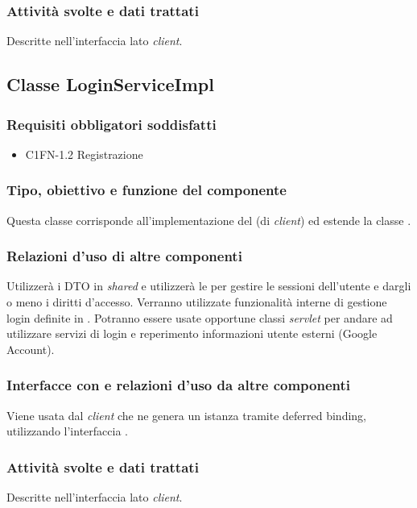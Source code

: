 \subsubsection*{Attivit\`a svolte e dati trattati}
Descritte nell'interfaccia lato \emph{client}.

\subsection{Classe LoginServiceImpl}
\subsubsection*{Requisiti obbligatori soddisfatti}
\begin{itemize}
	\item C1FN-1.2 Registrazione
\end{itemize}
\subsubsection*{Tipo, obiettivo e funzione del componente}
Questa classe corrisponde all'implementazione del  (di
\emph{client}) ed estende la classe .

\subsubsection*{Relazioni d'uso di altre componenti}
Utilizzer\`a i DTO in \emph{shared} e utilizzer\`a le  per
gestire le sessioni dell'utente e dargli o meno i diritti d'accesso.
Verranno utilizzate funzionalit\`a interne di gestione login definite in
. Potranno essere usate opportune classi \emph{servlet} per
andare ad utilizzare servizi di login e reperimento informazioni utente esterni
(Google Account).

\subsubsection*{Interfacce con e relazioni d'uso da altre componenti}
Viene usata dal \emph{client} che ne genera un istanza tramite deferred binding,
utilizzando l'interfaccia .

\subsubsection*{Attivit\`a svolte e dati trattati}
Descritte nell'interfaccia lato \emph{client}.

